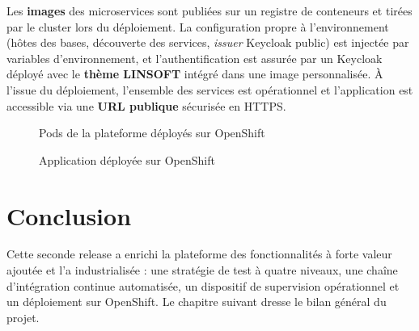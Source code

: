 Les \textbf{images} des microservices sont publiées sur un registre de conteneurs et tirées
par le cluster lors du déploiement. La configuration propre à l'environnement (hôtes des
bases, découverte des services, \textit{issuer} Keycloak public) est injectée par variables
d'environnement, et l'authentification est assurée par un Keycloak déployé avec le
\textbf{thème LINSOFT} intégré dans une image personnalisée. À l'issue du déploiement,
l'ensemble des services est opérationnel et l'application est accessible via une
\textbf{URL publique} sécurisée en HTTPS.

\begin{figure}[H]\centering
  \caption{Pods de la plateforme déployés sur OpenShift}\label{fig:os-pods}
\end{figure}

\begin{figure}[H]\centering
  \caption{Application déployée sur OpenShift}\label{fig:os-app}
\end{figure}

\section*{Conclusion}
Cette seconde release a enrichi la plateforme des fonctionnalités à forte valeur ajoutée et
l'a industrialisée : une stratégie de test à quatre niveaux, une chaîne d'intégration continue
automatisée, un dispositif de supervision opérationnel et un déploiement sur OpenShift. Le
chapitre suivant dresse le bilan général du projet.
\clearpage